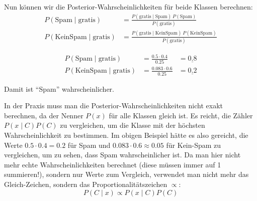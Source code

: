 \begin{myexample}
    Nun können wir die Posterior-Wahrscheinlichkeiten für beide Klassen berechnen:
    \[
        \begin{aligned}
            P(\text{Spam}\mid\text{gratis})     & =\frac{P(\text{gratis}\mid\text{Spam})\,P(\text{Spam})}{P(\text{gratis})}         \\
            P(\text{KeinSpam}\mid\text{gratis}) & =\frac{P(\text{gratis}\mid\text{KeinSpam})\,P(\text{KeinSpam})}{P(\text{gratis})}
        \end{aligned}
    \]

    \[
        \begin{aligned}
            P(\text{Spam}\mid\text{gratis})     & =\frac{0.5 \cdot 0.4}{0.25}   & =\underline{0.8}  \\
            P(\text{KeinSpam}\mid\text{gratis}) & =\frac{0.083 \cdot 0.6}{0.25} & = \underline{0.2}
        \end{aligned}
    \]

    Damit ist \enquote{Spam} wahrscheinlicher.
\end{myexample}

\begin{myremark}
    In der Praxis muss man die Posterior-Wahrscheinlichkeiten nicht exakt berechnen, da der Nenner $P(x)$ für alle Klassen gleich ist. Es reicht, die Zähler $P(x\mid C) P(C)$ zu vergleichen, um die Klasse mit der höchsten Wahrscheinlichkeit zu bestimmen. Im obigen Beispiel hätte es also gereicht, die Werte $0.5 \cdot 0.4 = 0.2$ für Spam und $0.083 \cdot 0.6 \approx 0.05$ für Kein-Spam zu vergleichen, um zu sehen, dass Spam wahrscheinlicher ist. Da man hier nicht mehr echte Wahrscheinlichkeiten berechnet (diese müssen immer auf 1 summieren!), sondern nur Werte zum Vergleich, verwendet man nicht mehr das Gleich-Zeichen, sondern das Proportionalitätszeichen $\propto$:
    \[
        P(C\mid x) \propto P(x\mid C) P(C)
    \]
\end{myremark}

